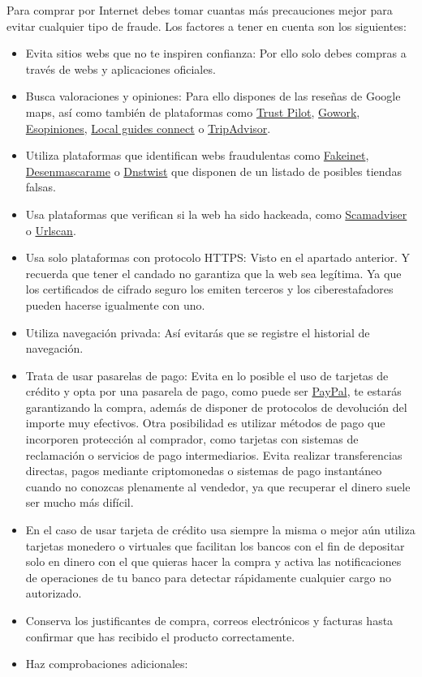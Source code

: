 \documentclass[
  spanish,
  a4paper,
  openany]{book}
\begin{document}
Para comprar por Internet debes tomar cuantas más precauciones mejor para evitar cualquier tipo de fraude. Los factores a tener en cuenta son los siguientes:

\begin{itemize}
\item
  Evita sitios webs que no te inspiren confianza: Por ello solo debes compras a través de webs y aplicaciones oficiales.
\item
  Busca valoraciones y opiniones: Para ello dispones de las reseñas de Google maps, así como también de plataformas como \href{https://es.trustpilot.com/}{Trust Pilot}, \href{https://es.gowork.com/}{Gowork}, \href{https://esopiniones.com/}{Esopiniones}, \href{https://www.localguidesconnect.com/}{Local guides connect} o \href{https://www.tripadvisor.es/}{TripAdvisor}.
\item
  Utiliza plataformas que identifican webs fraudulentas como \href{https://fakeinet.com/}{Fakeinet}, \href{https://desenmascara.me/}{Desenmascarame} o \href{https://dnstwist.it/}{Dnstwist} que disponen de un listado de posibles tiendas falsas.
\item
  Usa plataformas que verifican si la web ha sido hackeada, como \href{https://www.scamadviser.com/}{Scamadviser} o \href{https://urlscan.io/}{Urlscan}.
\item
  Usa solo plataformas con protocolo HTTPS: Visto en el apartado anterior. Y recuerda que tener el candado no garantiza que la web sea legítima. Ya que los certificados de cifrado seguro los emiten terceros y los ciberestafadores pueden hacerse igualmente con uno.
\item
  Utiliza navegación privada: Así evitarás que se registre el historial de navegación.
\item
  Trata de usar pasarelas de pago: Evita en lo posible el uso de tarjetas de crédito y opta por una pasarela de pago, como puede ser \href{https://www.paypal.com/es/home}{PayPal}, te estarás garantizando la compra, además de disponer de protocolos de devolución del importe muy efectivos. Otra posibilidad es utilizar métodos de pago que incorporen protección al comprador, como tarjetas con sistemas de reclamación o servicios de pago intermediarios. Evita realizar transferencias directas, pagos mediante criptomonedas o sistemas de pago instantáneo cuando no conozcas plenamente al vendedor, ya que recuperar el dinero suele ser mucho más difícil.
\item
  En el caso de usar tarjeta de crédito usa siempre la misma o mejor aún utiliza tarjetas monedero o virtuales que facilitan los bancos con el fin de depositar solo en dinero con el que quieras hacer la compra y activa las notificaciones de operaciones de tu banco para detectar rápidamente cualquier cargo no autorizado.
\item
  Conserva los justificantes de compra, correos electrónicos y facturas hasta confirmar que has recibido el producto correctamente.
\item
  Haz comprobaciones adicionales:


\end{itemize}
\end{document}
